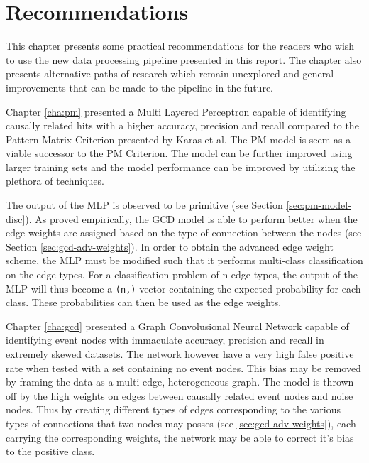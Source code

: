 
\chapter{Recommendations} %
\label{cha:rec}

% 

This chapter presents some practical recommendations for the readers
who wish to use the new data processing pipeline presented in this
report. The chapter also presents alternative paths of research which
remain unexplored and general improvements that can be made to the
pipeline in the future.

Chapter \ref{cha:pm} presented a Multi Layered Perceptron capable of
identifying causally related hits with a higher accuracy, precision
and recall compared to the Pattern Matrix Criterion presented by Karas
et al. The PM model is seem as a viable successor to the PM Criterion.
The model can be further improved using larger training sets and the
model performance can be improved by utilizing the plethora of
techniques.

The output of the MLP is observed to be primitive (see Section
\ref{sec:pm-model-disc}). As proved empirically, the GCD model is able
to perform better when the edge weights are assigned based on the type
of connection between the nodes (see Section
\ref{sec:gcd-adv-weights}). In order to obtain the advanced edge
weight scheme, the MLP must be modified such that it performs
multi-class classification on the edge types. For a classification
problem of n edge types, the output of the MLP will thus become a
\texttt{(n,)} vector containing the expected probability for each
class. These probabilities can then be used as the edge weights.

Chapter \ref{cha:gcd} presented a Graph Convolusional Neural Network
capable of identifying event nodes with immaculate accuracy, precision
and recall in extremely skewed datasets. The network however have a
very high false positive rate when tested with a set containing no
event nodes. This bias may be removed by framing the data as a
multi-edge, heterogeneous graph. The model is thrown off by the high
weights on edges between causally related event nodes and noise nodes.
Thus by creating different types of edges corresponding to the various
types of connections that two nodes may posses (see
\ref{sec:gcd-adv-weights}), each carrying the corresponding weights,
the network may be able to correct it's bias to the positive class.

